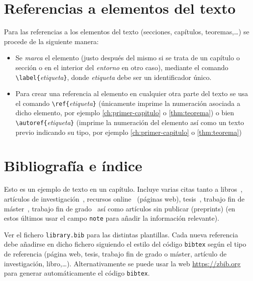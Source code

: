 \section{Referencias a elementos del texto}\label{sec:referencias}

Para las referencias a los elementos del texto (secciones, capítulos, teoremas,\ldots) se procede de la siguiente manera:
\begin{itemize}
  \item Se \emph{marca} el elemento (justo después del mismo si se trata de un capítulo o sección o en el interior del \emph{entorno} en otro caso), mediante el comando \verb+\label{+\emph{etiqueta}\verb+}+, donde \emph{etiqueta} debe ser un identificador único.
  \item Para crear una referencia al elemento en cualquier otra parte del texto se usa el comando \verb+\ref{+\emph{etiqueta}\verb+}+ (únicamente imprime la numeración asociada a dicho elemento, por ejemplo \ref{ch:primer-capitulo} o \ref{thm:teorema}) o bien \verb+\autoref{+\emph{etiqueta}\verb+}+ (imprime la numeración del elemento así como un texto previo indicando su tipo, por ejemplo \autoref{ch:primer-capitulo} o \autoref{thm:teorema})
\end{itemize}





\section{Bibliografía e índice}

Esto es un ejemplo de texto en un capítulo. Incluye varias citas tanto a libros~\cite{Aigner2018}, artículos de investigación~\cite{Euler1985}, recursos online~\cite{EulerWiki} (páginas web), tesis~\cite{CitekeyPhdthesis}, trabajo fin de máster~\cite{CitekeyMastersthesis}, trabajo fin de grado~\cite{CiteKeyBachelorsthesis} así como artículos sin publicar (preprints) \cite{castroinfantes2022conjugate} (en estos últimos usar el campo \texttt{note} para añadir la información relevante). 

Ver el fichero \texttt{library.bib} para las distintas plantillas. Cada nueva referencia debe añadirse en dicho fichero siguiendo el estilo del código \texttt{bibtex} según el tipo de referencia (página web, tesis, trabajo fin de grado o máster, artículo de investigación, libro,\ldots). Alternativamente se puede usar la web \href{https://zbib.org}{https://zbib.org} para generar automáticamente el código \texttt{bibtex}.


\endinput
